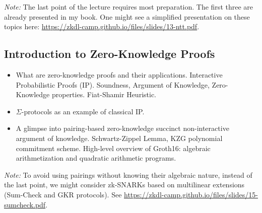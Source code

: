 \documentclass{template}
\begin{document}
\textit{Note:} The last point of the lecture requires most preparation. The
first three are already presented in my book. One might see a simplified
presentation on these topics here:
\url{https://zkdl-camp.github.io/files/slides/13-ntt.pdf}.

\subsection*{Introduction to Zero-Knowledge Proofs}

\begin{itemize}
    \item What are zero-knowledge proofs and their applications. Interactive
    Probabilistic Proofs (IP). Soundness, Argument of Knowledge, Zero-Knowledge
    properties. Fiat-Shamir Heuristic.
    \item $\Sigma$-protocols as an example of classical IP.
    \item A glimpse into pairing-based zero-knowledge succinct non-interactive
    argument of knowledge. Schwartz-Zippel Lemma, KZG polynomial commitment
    scheme. High-level overview of Groth16: algebraic arithmetization and
    quadratic arithmetic programs.
\end{itemize}

\textit{Note:} To avoid using pairings without knowing their algebraic nature,
instead of the last point, we might consider zk-SNARKs based on multilinear
extensions (Sum-Check and GKR protocols). See
\url{https://zkdl-camp.github.io/files/slides/15-sumcheck.pdf}.
\end{document}
